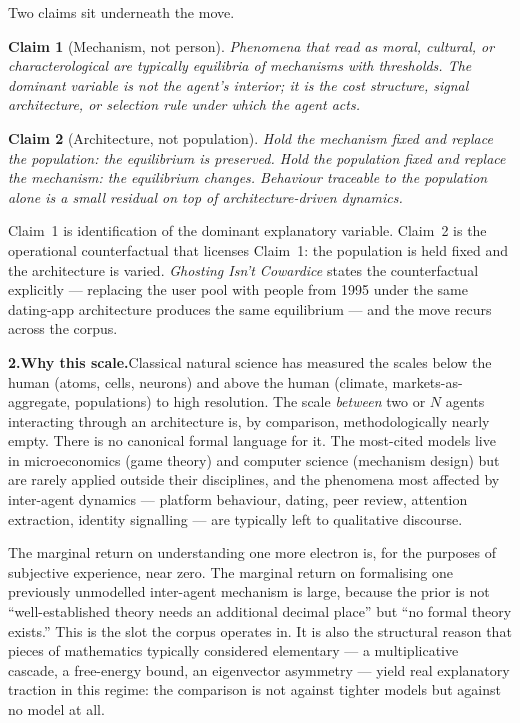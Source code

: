 \documentclass[11pt]{article}
\newtheorem{claim}{Claim}
\begin{document}
\medskip\noindent Two claims sit underneath the move.

\begin{claim}[Mechanism, not person]
Phenomena that read as moral, cultural, or characterological are typically
equilibria of mechanisms with thresholds. The dominant variable is not the
agent's interior; it is the cost structure, signal architecture, or
selection rule under which the agent acts.
\end{claim}

\begin{claim}[Architecture, not population]
Hold the mechanism fixed and replace the population: the equilibrium is
preserved. Hold the population fixed and replace the mechanism: the
equilibrium changes. Behaviour traceable to the population alone is a small
residual on top of architecture-driven dynamics.
\end{claim}

\noindent Claim~1 is identification of the dominant explanatory variable.
Claim~2 is the operational counterfactual that licenses Claim~1: the
population is held fixed and the architecture is varied. \textit{Ghosting
Isn't Cowardice} states the counterfactual explicitly --- replacing the user
pool with people from 1995 under the same dating-app architecture produces
the same equilibrium --- and the move recurs across the corpus.

\newpage

\noindent\textbf{2.\quad Why this scale.}\quad Classical natural science has
measured the scales below the human (atoms, cells, neurons) and above the
human (climate, markets-as-aggregate, populations) to high resolution. The
scale \textit{between} two or $N$ agents interacting through an architecture
is, by comparison, methodologically nearly empty. There is no canonical
formal language for it. The most-cited models live in microeconomics (game
theory) and computer science (mechanism design) but are rarely applied
outside their disciplines, and the phenomena most affected by inter-agent
dynamics --- platform behaviour, dating, peer review, attention extraction,
identity signalling --- are typically left to qualitative discourse.

\medskip\noindent The marginal return on understanding one more electron is,
for the purposes of subjective experience, near zero. The marginal return on
formalising one previously unmodelled inter-agent mechanism is large,
because the prior is not ``well-established theory needs an additional
decimal place'' but ``no formal theory exists.'' This is the slot the corpus
operates in. It is also the structural reason that pieces of mathematics
typically considered elementary --- a multiplicative cascade, a free-energy
bound, an eigenvector asymmetry --- yield real explanatory traction in this
regime: the comparison is not against tighter models but against no model at
all.
\end{document}
